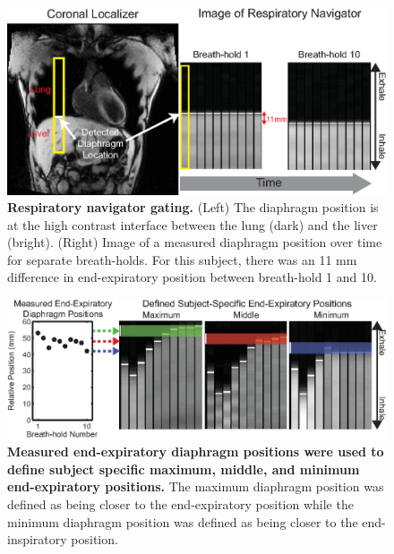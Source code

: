 	\begin{figure}
		\includegraphics{figures/torsionpaper/Fig3-navigatorGatingExplanationNoAccWin}
		\caption[Respiratory navigator gating]{\textbf{Respiratory navigator gating.} (Left) The diaphragm position is at the high contrast interface between the lung (dark) and the liver (bright). (Right) Image of a measured diaphragm position over time for separate breath-holds. For this subject, there was an 11 mm difference in end-expiratory position between breath-hold 1 and 10.}
		\label{fig:navigatorgating}
	\end{figure}
	
	\begin{figure}
		\includegraphics{figures/torsionpaper/Fig4-definedTranslatedAccWindow}
		\caption[Measured end expiratory diaphragm positions were used to define subject specific maximum, middle, and minimum end expiratory positions]{\textbf{Measured end-expiratory diaphragm positions were used to define subject specific maximum, middle, and minimum end-expiratory positions.} The maximum diaphragm position was defined as being closer to the end-expiratory position while the minimum diaphragm position was defined as being closer to the end-inspiratory position.}
		\label{fig:navigatorpositions}
	\end{figure}
	
